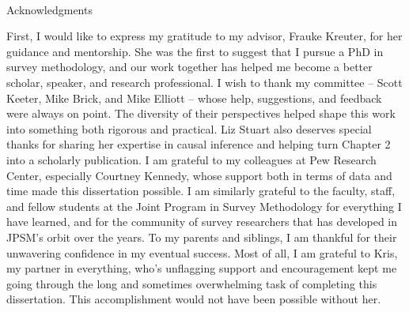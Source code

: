 
\renewcommand{\baselinestretch}{2}
\small\normalsize
\hbox{\ }
 
\vspace{-.65in}

\begin{center}
\large{Acknowledgments} 
\end{center} 

\vspace{1ex}

First, I would like to express my gratitude to my advisor, Frauke Kreuter, for her guidance and mentorship. She was the first to suggest that I pursue a PhD in survey methodology, and our work together has helped me become a better scholar, speaker, and research professional. 
I wish to thank my committee -- Scott Keeter, Mike Brick, and Mike Elliott -- whose help, suggestions, and feedback were always on point. The diversity of their perspectives helped shape this work into something both rigorous and practical. 
Liz Stuart also deserves special thanks for sharing her expertise in causal inference and helping turn Chapter 2 into a scholarly publication.
I am grateful to my colleagues at Pew Research Center, especially Courtney Kennedy, whose support both in terms of data and time made this dissertation possible. 
I am similarly grateful to the faculty, staff, and fellow students at the Joint Program in Survey Methodology for everything I have learned, and for the community of survey researchers that has developed in JPSM’s orbit over the years. 
To my parents and siblings, I am thankful for their unwavering confidence in my eventual success.
Most of all, I am grateful to Kris, my partner in everything, who’s unflagging support and encouragement kept me going through the long and sometimes overwhelming task of completing this dissertation. This accomplishment would not have been possible without her.



